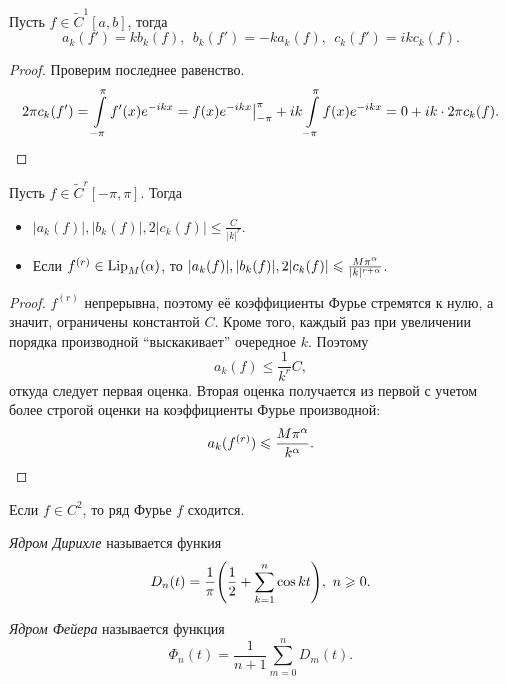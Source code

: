 \begin{lemma}
    Пусть $f \in \widetilde{C}^1[a, b]$, тогда
    \[
        a_k(f') = k b_k(f),~~ b_k(f') = -k a_k(f),~~ c_k(f') = ik c_k(f)
    .\]
\end{lemma}
\begin{proof}
    Проверим последнее равенство.
    \[
        2 \pi c_k(f') = \int\limits_{-\pi}^\pi{f'(x) e^{-ikx}} = f(x) e^{-ikx}\big|_{-\pi}^\pi +
        ik \int\limits_{-\pi}^\pi{f(x) e^{-ikx}} = 0 + ik \cdot 2 \pi c_k(f)
    .\]
\end{proof}

\begin{corollary}
    Пусть $f \in \widetilde{C}^r[-\pi, \pi]$. Тогда
    \begin{itemize}
        \item $|a_k(f)|, |b_k(f)|, 2|c_k(f)| \leqslant \frac{C}{|k|^r}$.
        \item Если $f^{(r)} \in \operatorname{Lip}_M(\alpha)$, то $|a_k(f)|, |b_k(f)|, 2|c_k(f)|
            \leqslant \frac{M \pi^\alpha}{|k|^{r + \alpha}}$.
    \end{itemize}
\end{corollary}
\begin{proof}
    $f^{(r)}$ непрерывна, поэтому её коэффициенты Фурье стремятся к нулю, а значит,
    ограничены константой $C$. Кроме того, каждый раз при увеличении порядка
    производной ``выскакивает'' очередное $k$. Поэтому
    \[
        a_k(f) \leqslant \frac{1}{k^r} C 
    ,\]
    откуда следует первая оценка. Вторая оценка получается из первой с учетом
    более строгой оценки на коэффициенты Фурье производной:
    \[
        a_k(f^{(r)}) \leqslant \frac{M \pi^\alpha}{k^\alpha}
    .\]
\end{proof}

\begin{corollary}
    Если $f \in C^2$, то ряд Фурье $f$ сходится.
\end{corollary}

\begin{definition}
    \textit{Ядром Дирихле} называется функия
    \[
        D_n(t) = \frac{1}{\pi}\parens*{\frac{1}{2} + \sum_{k = 1}^n{\cos{kt}}},~ n \geqslant 0
    .\]
\end{definition}

\begin{definition}
    \textit{Ядром Фейера} называется функция
    \[
        \Phi_n(t) = \frac{1}{n + 1} \sum_{m = 0}^n{D_m(t)}
    .\]
\end{definition}

